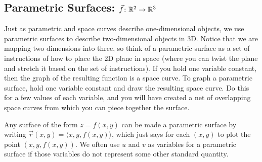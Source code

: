 \subsection{Parametric Surfaces: {$\vec f\colon {\ensuremath{\mathbb{R}}}^2\to {\ensuremath{\mathbb{R}}}^3$} }

Just as parametric and space curves describe one-dimensional objects, we use parametric surfaces to describe two-dimensional objects in 3D.  Notice that we are mapping two dimensions into three, so think of a parametric surface as a set of instructions of how to place the 2D plane in space (where you can twist the plane and stretch it based on the set of instructions).  If you hold one variable constant, then the graph of the resulting function is a space curve. To graph a parametric surface, hold one variable constant and draw the resulting space curve.  Do this for a few values of each variable, and you will have created a net of overlapping space curves from which you can piece together the surface.  

Any surface of the form $z=f(x,y)$ can be made a parametric surface by
writing $\vec r(x,y)=\langle x,y,f(x,y)\rangle$, which just says for
each $(x,y)$ to plot the point $(x,y,f(x,y))$. We often use $u$ and
$v$ as variables for a parametric surface if those variables do not
represent some other standard quantity.

